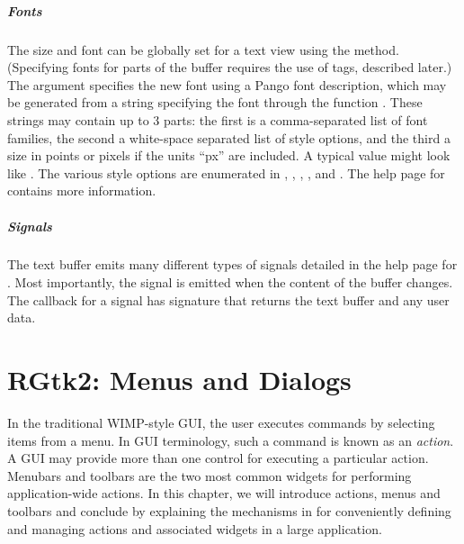 \paragraph{Fonts}
The size and font can be globally set for a text view using the
 method. (Specifying fonts for parts of
the buffer requires the use of tags, described later.) The argument
 specifies the new font using
a Pango font description, which may be generated from a
string specifying the font through the function
. These strings may contain up to
3 parts: the first is a comma-separated list of font families, the
second a white-space separated list of style options, and the third a
size in points or pixels if the units ``px'' are included. A typical
value might look like . The various style options are enumerated in ,
, , , and
. The help page for 
contains more information.

\paragraph{Signals}
The text buffer emits many different types of signals detailed in the
help page for . Most importantly, the
 signal is emitted when the content of the buffer
changes. The callback for a  signal has signature that
returns the text buffer and any user data.







\chapter{RGtk2: Menus and Dialogs}
\label{sec:RGtk2-menus}


In the traditional WIMP-style GUI, the user executes commands by
selecting items from a menu. In GUI terminology, such a command is
known as an \textit{action}. A GUI may provide more than one control
for executing a particular action. Menubars and toolbars are the two
most common widgets for performing application-wide actions. In this
chapter, we will introduce actions, menus and toolbars and conclude by
explaining the mechanisms in \GTK\/ for conveniently defining and
managing actions and associated widgets in a large application.

